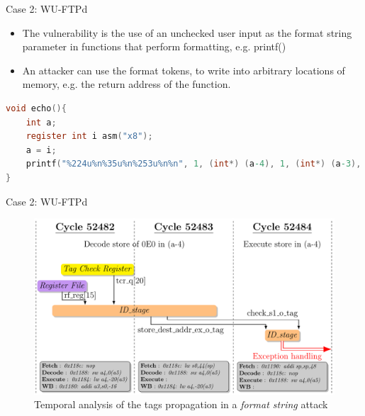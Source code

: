 \begin{frame}{Case 2: WU-FTPd}
    \begin{itemize}
        \justifying
        \item The vulnerability is the use of an unchecked user input as the format string parameter in functions that perform formatting, e.g. printf()
        \item An attacker can use the format tokens, to write into arbitrary locations of memory, e.g. the return address of the function.
    \end{itemize}

    \centering
    \begin{minipage}[c]{\textwidth}
        \begin{lstlisting}[language=C,label=code:printfNFormat]
void echo(){
    int a;
    register int i asm("x8");
    a = i;
    printf("%224u%n%35u%n%253u%n%n", 1, (int*) (a-4), 1, (int*) (a-3), 1, (int*) (a-2), (int*) (a-1));
}\end{lstlisting}
    \end{minipage}
\end{frame}

\begin{frame}[noframenumbering]{Case 2: WU-FTPd}
    \begin{figure}
        \centering
        \includegraphics[height=.8\textheight]{src/2_vuln_assessment/img/wuftpd/ftpd_short.pdf}
        \caption{Temporal analysis of the tags propagation in a \textit{format string} attack}
        \label{fig:analyseTempoFormatString}
    \end{figure}
\end{frame}

